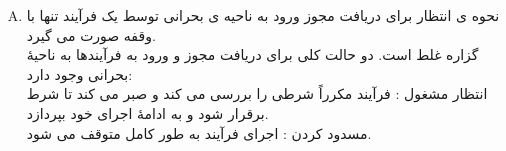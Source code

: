 \documentclass[]{article}
\begin{document}
\begin{enumerate}[(A)]
      \item نحوه ی انتظار برای دریافت مجوز ورود به ناحیه ی بحرانی توسط یک فرآیند تنها با وقفه صورت می گیرد.
            \\ گزاره غلط است. دو حالت کلی برای دریافت مجوز و ورود به فرآیندها به ناحیۀ بحرانی وجود دارد:
            \\
            انتظار مشغول  :
            فرآیند مکرراً شرطی را بررسی می کند و صبر می کند تا شرط برقرار شود و به ادامۀ اجرای خود بپردازد.
            \\
            مسدود کردن  :
            اجرای فرآیند به طور کامل متوقف می شود.

\end{enumerate}
\end{document}
